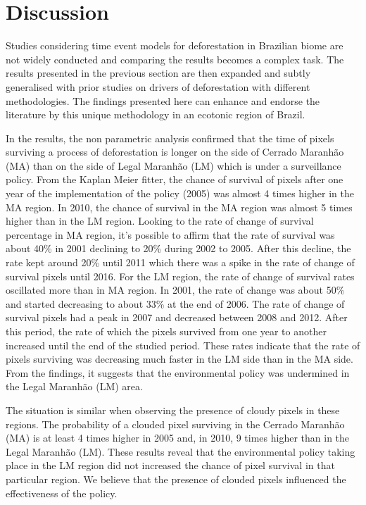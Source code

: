 \section{Discussion} 
\label{S:5}
Studies considering time event models for deforestation in Brazilian biome are not widely conducted and comparing the results becomes a complex task. The results presented in the previous section are then expanded and subtly generalised with prior studies on drivers of deforestation with different methodologies. The findings presented here can enhance and endorse the literature by this unique methodology in an ecotonic region of Brazil.


In the results, the non parametric analysis confirmed that the time of pixels surviving a process of deforestation is longer on the side of Cerrado Maranhão (MA) than on the side of Legal Maranhão (LM) which is under a surveillance policy. From the Kaplan Meier fitter, the chance of survival of pixels after one year of the implementation of the policy (2005) was almost 4 times higher in the MA region. In 2010, the chance of survival in the MA region was almost 5 times higher than in the LM region. Looking to the rate of change of survival percentage in MA region, it's possible to affirm that the rate of survival was about 40\% in 2001 declining to 20\% during 2002 to 2005. After this decline, the rate kept around 20\% until 2011 which there was a spike in the rate of change of survival pixels until 2016. For the LM region, the rate of change of survival rates oscillated more than in MA region. In 2001, the rate of change was about 50\% and started decreasing to about 33\% at the end of 2006. The rate of change of survival pixels had a peak in 2007 and decreased between 2008 and 2012. After this period, the rate of which the pixels survived from one year to another increased until the end of the studied period. These rates indicate that the rate of pixels surviving was decreasing much faster in the LM side than in the MA side. From the findings, it suggests that the environmental policy was undermined in the Legal Maranhão (LM) area. 

The situation is similar when observing the presence of cloudy pixels in these regions. The probability of a clouded pixel surviving in the Cerrado Maranhão (MA) is at least 4 times higher in 2005 and, in 2010, 9 times higher than in the Legal Maranhão (LM). These results reveal that the environmental policy taking place in the LM region did not increased the chance of pixel survival in that particular region. We believe that the presence of clouded pixels influenced the effectiveness of the policy. 

